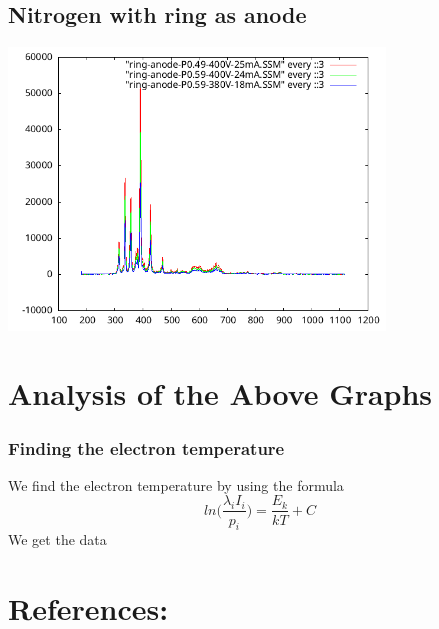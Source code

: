 \documentclass[]{report}[12 pt]
\begin{document}
\subsection{Nitrogen with ring as anode }
\begin{center}
	\includegraphics[width=10cm]{nitrogen_ring_anode.png}
\end{center}

\section{Analysis of the Above Graphs}
\subsubsection{Finding the electron temperature}
We find the electron temperature by using the formula
\[ln\bigg(\frac{\lambda_iI_i}{p_i}\bigg)=\frac{E_k}{kT}+C\]
We get the data
\section*{References:}
\end{document}
